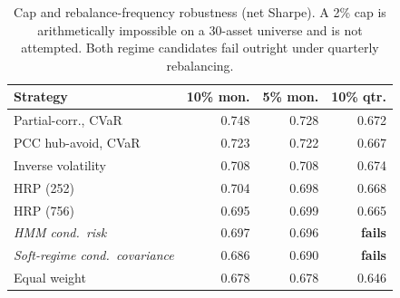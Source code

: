 \begin{table}[t]
\centering
\caption{Cap and rebalance-frequency robustness (net Sharpe). A 2\% cap is
arithmetically impossible on a 30-asset universe and is not attempted.
Both regime candidates fail outright under quarterly rebalancing.}
\label{tab:robustness}
\footnotesize
\begin{tabular}{lrrr}
\toprule
Strategy & 10\% mon. & 5\% mon. & 10\% qtr. \\
\midrule
Partial-corr., CVaR & 0.748 & 0.728 & 0.672 \\
PCC hub-avoid, CVaR & 0.723 & 0.722 & 0.667 \\
Inverse volatility & 0.708 & 0.708 & 0.674 \\
HRP (252) & 0.704 & 0.698 & 0.668 \\
HRP (756) & 0.695 & 0.699 & 0.665 \\
\emph{HMM cond.\ risk} & 0.697 & 0.696 & \textbf{fails} \\
\emph{Soft-regime cond.\ covariance} & 0.686 & 0.690 & \textbf{fails} \\
Equal weight & 0.678 & 0.678 & 0.646 \\
\bottomrule
\end{tabular}
\end{table}
